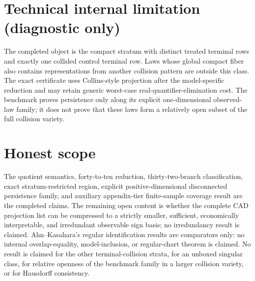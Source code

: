 \documentclass{article}
\begin{document}
\section*{Technical internal limitation (diagnostic only)}

The completed object is the compact stratum with distinct treated terminal rows and exactly one collided control terminal row. Laws whose global compact fiber also contains representations from another collision pattern are outside this class. The exact certificate uses Collins-style projection after the model-specific reduction and may retain generic worst-case real-quantifier-elimination cost. The benchmark proves persistence only along its explicit one-dimensional observed-law family; it does not prove that these laws form a relatively open subset of the full collision variety.

\section{Honest scope}

The quotient semantics, forty-to-ten reduction, thirty-two-branch classification, exact stratum-restricted region, explicit positive-dimensional disconnected persistence family, and auxiliary appendix-tier finite-sample coverage result are the completed claims. The remaining open content is whether the complete CAD projection list can be compressed to a strictly smaller, sufficient, economically interpretable, and irredundant observable sign basis; no irredundancy result is claimed. Ahn--Kasahara's regular identification results are comparators only: no internal overlap-equality, model-inclusion, or regular-chart theorem is claimed. No result is claimed for the other terminal-collision strata, for an unboxed singular class, for relative openness of the benchmark family in a larger collision variety, or for Hausdorff consistency.
\end{document}
